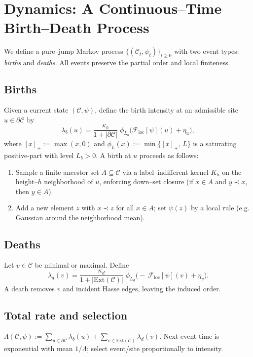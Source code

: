 \documentclass[12pt]{article}
\theoremstyle{definition}
\newcommand{\C}{\mathcal{C}}
\newcommand{\Ps}{\psi}
\newcommand{\Fop}{\mathcal{F}}
\begin{document}
\section{Dynamics: A Continuous--Time Birth--Death Process}
\label{sec:dynamics}
We define a pure--jump Markov process \(\{(\C_t,\Ps_t)\}_{t\ge0}\) with two event types: \emph{births} and \emph{deaths}. All events preserve the partial order and local finiteness.

\subsection{Births}
Given a current state \((\C,\Ps)\), define the birth intensity at an admissible site \(u\in\partial\C\) by
\begin{equation}\label{eq:birthrate}
\lambda_b(u)
= \frac{\kappa_b}{1+|\partial\C|}\;\phi_{L_b}\!\Big(\Fop_{\mathrm{loc}}[\Ps](u) + \eta_u\Big),
\end{equation}
where \([x]_+ := \max(x,0)\) and \(\phi_{L}(x):=\min\{[x]_+,\,L\}\) is a saturating positive-part with level \(L_b>0\).
A birth at \(u\) proceeds as follows:
\begin{enumerate}[label=\textbf{B\arabic*}., leftmargin=1.4em]
  \item Sample a finite ancestor set \(A\subseteq \C\) via a label--indifferent kernel \(K_h\) on the height--\(h\) neighborhood of \(u\), enforcing down--set closure (if \(x\in A\) and \(y\prec x\), then \(y\in A\)).
  \item Add a new element \(z\) with \(x\prec z\) for all \(x\in A\); set \(\Ps(z)\) by a local rule (e.g. Gaussian around the neighborhood mean).
\end{enumerate}

\subsection{Deaths}
Let \(v\in\C\) be minimal or maximal. Define
\begin{equation}\label{eq:deathrate}
\lambda_d(v)
= \frac{\kappa_d}{1+|\mathrm{Ext}(\C)|}\;\phi_{L_d}\!\Big(-\,\Fop_{\mathrm{loc}}[\Ps](v) + \eta_v\Big).
\end{equation}
A death removes \(v\) and incident Hasse edges, leaving the induced order.

\subsection{Total rate and selection}
\(\Lambda(\C,\Ps) := \sum_{u\in\partial\C}\lambda_b(u) + \sum_{v\in\mathrm{Ext}(\C)}\lambda_d(v)\).
Next event time is exponential with mean \(1/\Lambda\); select event/site proportionally to intensity.
\end{document}
